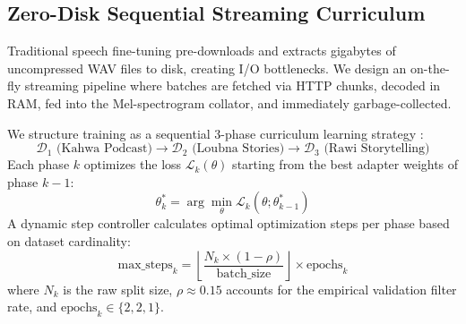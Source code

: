 \documentclass[11pt,a4paper]{article}
\begin{document}
\subsection{Zero-Disk Sequential Streaming Curriculum}
Traditional speech fine-tuning pre-downloads and extracts gigabytes of uncompressed WAV files to disk, creating I/O bottlenecks. We design an on-the-fly streaming pipeline where batches are fetched via HTTP chunks, decoded in RAM, fed into the Mel-spectrogram collator, and immediately garbage-collected.

We structure training as a sequential 3-phase curriculum learning strategy \cite{bengio2009curriculum}:
\begin{equation}
\mathcal{D}_1 \text{ (Kahwa Podcast)} \longrightarrow \mathcal{D}_2 \text{ (Loubna Stories)} \longrightarrow \mathcal{D}_3 \text{ (Rawi Storytelling)}
\end{equation}
Each phase $k$ optimizes the loss $\mathcal{L}_k(\theta)$ starting from the best adapter weights of phase $k-1$:
\begin{equation}
\theta_k^* = \arg\min_{\theta} \mathcal{L}_k(\theta; \theta_{k-1}^*)
\end{equation}
A dynamic step controller calculates optimal optimization steps per phase based on dataset cardinality:
\begin{equation}
\text{max\_steps}_k = \left\lfloor \frac{N_k \times (1 - \rho)}{\text{batch\_size}} \right\rfloor \times \text{epochs}_k
\end{equation}
where $N_k$ is the raw split size, $\rho \approx 0.15$ accounts for the empirical validation filter rate, and $\text{epochs}_k \in \{2, 2, 1\}$.
\end{document}
